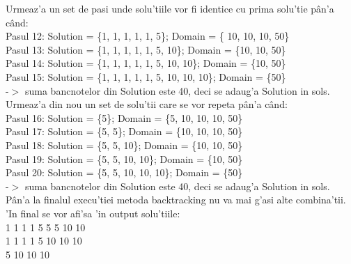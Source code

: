 Urmeaz'a un set de pasi unde solu'tiile vor fi identice cu prima solu'tie p\^an'a c\^and:\\

Pasul 12: Solution = \{1, 1, 1, 1, 1, 5\}; Domain = \{ 10, 10, 10, 50\}\\
\myindent
Pasul 13: Solution = \{1, 1, 1, 1, 1, 5, 10\}; Domain = \{10, 10, 50\}\\
\myindent
Pasul 14: Solution = \{1, 1, 1, 1, 1, 5, 10, 10\}; Domain = \{10, 50\}\\
\myindent
Pasul 15: Solution = \{1, 1, 1, 1, 1, 5, 10, 10, 10\}; Domain = \{50\}\\
\myindent
-$>$ suma bancnotelor din Solution este 40, deci se adaug'a Solution in sols.\\

Urmeaz'a din nou un set de solu'tii care se vor repeta p\^an'a c\^and:\\

Pasul 16: Solution = \{5\}; Domain = \{5, 10, 10, 10, 50\}\\
\myindent
Pasul 17: Solution = \{5, 5\}; Domain = \{10, 10, 10, 50\}\\
\myindent
Pasul 18: Solution = \{5, 5, 10\}; Domain = \{10, 10, 50\}\\
\myindent
Pasul 19: Solution = \{5, 5, 10, 10\}; Domain = \{10, 50\}\\
\myindent
Pasul 20: Solution = \{5, 5, 10, 10, 10\}; Domain = \{50\}\\
\myindent
-$>$ suma bancnotelor din Solution este 40, deci se adaug'a Solution in sols.\\

P\^an'a la finalul execu'tiei metoda backtracking nu va mai g'asi alte combina'tii. 'In final se vor afi'sa 'in output solu'tiile:\\
 1 1 1 1 5 5 5 10 10\\
 1 1 1 1 5 10 10 10\\
 5 10 10 10\\
\myindent



